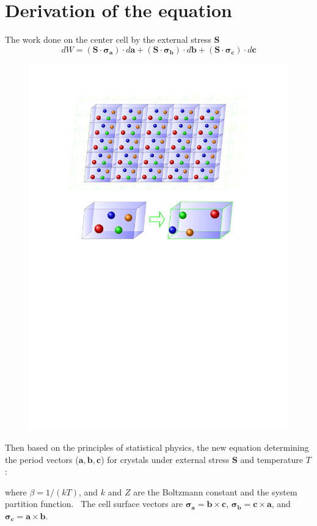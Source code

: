 \documentclass[8pt]{beamer}
\newcommand{\Tup}[0]{\mathbf S}
\newcommand{\bh}[0]{\mathbf h}
\newcommand{\ba}{\mathbf a}
\newcommand{\bb}{\mathbf b}
\newcommand{\bc}{\mathbf c}
\newcommand{\sbbbb}[0]{\bsigma_{\mathbf b}}
\newcommand{\scccc}[0]{\bsigma_{\mathbf c}}
\newcommand{\bsigma}{\mathbf \sigma}
\newcommand{\sh}[0]{\bsigma_{\mathbf h}}
\newcommand{\sa}[0]{\bsigma_{\mathbf a}}
\begin{document}
\section{Derivation of the equation}

\begin{frame}{The work done on the center cell by the external stress $\Tup$}
\vspace{-.5cm}
\begin{equation}
      dW =(\Tup \cdot \sa) \cdot d\ba + (\Tup \cdot \sbbbb) \cdot d\bb + (\Tup \cdot \scccc) \cdot d\bc  \label{sss080}
\end{equation}
\vspace{-1.5cm}
      \begin{figure} 
          \includegraphics[width=.8\textwidth]{./translated_cells_by_tikz.pdf}
      \end{figure}
\end{frame}


\begin{frame}{Then based on the principles of statistical physics, the new equation determining the period vectors ($\ba, \bb, \bc$) for crystals under external stress $\Tup$ and temperature $T$: }

\vspace{-1.7cm}{\LARGE  \color{white}{
\begin{equation}
       \Tup \cdot \sh=-\frac {1}{\beta} \frac {\partial \ln Z}{\partial \bh} \ \ \ (\bh=\ba, \bb, \bc) ,
       \label{sss100}
\end{equation}
}}

where $\beta=1/(kT)$, and $k$ and $Z$ are the Boltzmann constant and the system partition function. \  The cell surface vectors are $\sa=\bb \times \bc$, $\sbbbb=\bc \times \ba$, and $\scccc=\ba \times \bb$.
\end{frame}
\end{document}
